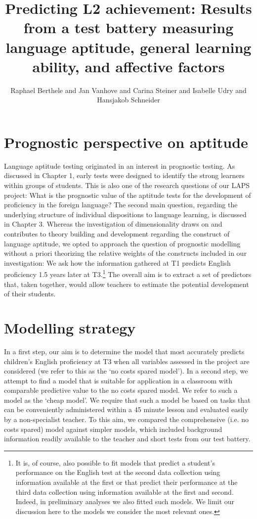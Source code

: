 \documentclass[output=paper]{langsci/langscibook}
\author{Raphael Berthele\orcid{}\affiliation{University of Fribourg, Institut de Plurilinguisme} and Jan Vanhove\orcid{}\affiliation{University of Fribourg, Institut de Plurilinguisme} and Carina Steiner\orcid{}\affiliation{University of Berne, Center for the Study of Language and Society} and Isabelle Udry\orcid{}\affiliation{University of Fribourg, Institut de Plurilinguisme; Zurich University of Teacher Education} and Hansjakob Schneider\orcid{}\affiliation{Zurich University of Teacher Education}}
\title[Predicting L2 achievement]
      {Predicting L2 achievement: Results from a test battery measuring language aptitude, general learning ability, and affective factors}
\begin{document}
\maketitle 


\section{Prognostic perspective on aptitude}

Language aptitude testing originated in an interest in prognostic testing. As discussed in Chapter 1, early tests were designed to identify the strong learners within groups of students. This is also one of the research questions of our LAPS project: What is the prognostic value of the aptitude tests for the development of proficiency in the foreign language? The second main question, regarding the underlying structure of individual dispositions to language learning, is discussed in Chapter 3.  Whereas the investigation of dimensionality draws on and contributes to theory building and development regarding the construct of language aptitude, we opted to approach the question of prognostic modelling without a priori theorizing the relative weights of the constructs included in our investigation: We ask how the information gathered at T1 predicts English proficiency 1.5 years later at T3.\footnote{It is, of course, also possible to fit models that predict a student’s performance on the English test at the second data collection using information available at the first or that predict their performance at the third data collection using information available at the first and second. Indeed, in preliminary analyses we also fitted such models. We limit our discussion here to the models we consider the most relevant ones.} The overall aim is to extract a set of predictors that, taken together, would allow teachers to estimate the potential development of their students.

\section{Modelling strategy}

In a first step, our aim is to determine the model that most accurately predicts children’s English proficiency at T3 when all variables assessed in the project are considered (we refer to this as the ‘no costs spared model’). In a second step, we attempt to find a model that is suitable for application in a classroom with comparable predictive value to the no costs spared model. We refer to such a model as the ‘cheap model’. We require that such a model be based on tasks that can be conveniently administered within a 45 minute lesson and evaluated easily by a non-specialist teacher. To this aim, we compared the comprehensive (i.e. no costs spared) model against simpler models, which included background information readily available to the teacher and short tests from our test battery.
\end{document}
